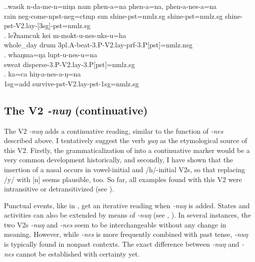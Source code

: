  \ex.\ag.wasik n-da-me-n=niŋa nam phen-a=na phen-a=na, phen-a-nes-a=na\\
 rain  {\sc neg-}come{\sc -npst-neg=ctmp} sun shine{\sc [3sg]-pst=nmlz.sg} shine{\sc [3sg]-pst=nmlz.sg} shine{\sc -pst-V2.lay-[3sg]-pst=nmlz.sg}\\
 \bg. leʔnamcuk kei m-mokt-u-nes-uks-u=ha\\
 whole\_day drum {\sc 3pl.A-}beat{\sc -3.P-V2.lay-prf-3.P[pst]=nmlz.nsg}\\
\bg. whaŋma=ŋa lupt-u-nes-u=na\\
sweat disperse{\sc -3.P-V2.lay-3.P[pst]=nmlz.sg}\\
 \bg. ka=ca hiŋ-a-nes-a-ŋ=na\\
 {\sc 1sg=add} survive{\sc -pst-V2.lay-pst-1sg=nmlz.sg}\\


\subsection{The V2 \emph{-nuŋ}  (continuative)}\label{V2-nung}%
 
The V2 \emph{-nuŋ}  adds a continuative reading, similar to the function of \emph{-nes} described above. I tentatively suggest the verb \emph{yuŋ}  as the etymological source of this V2. Firstly, the grammaticalization of  into a continuative marker would be a very common development historically, and secondly, I have shown that the insertion of a nasal occurs in vowel-initial and /h/-initial V2s, so that replacing /y/ with [n] seems plausible, too. So far, all examples found with this V2 were intransitive or detransitivized (see \Next).

Punctual events, like in \Next[a], get an iterative reading when \emph{-nuŋ} is added. States and activities can also be extended by means of \emph{-nuŋ} (see \Next[b], \Next[c]). In several instances, the two V2s \emph{-nuŋ} and \emph{-nes} seem to be interchangeable without any change in meaning. However, while \emph{-nes} is more frequently combined with past tense, \emph{-nuŋ} is typically found in  nonpast contexts. The exact difference between \emph{-nuŋ} and \emph{-nes} cannot be established with certainty yet.


